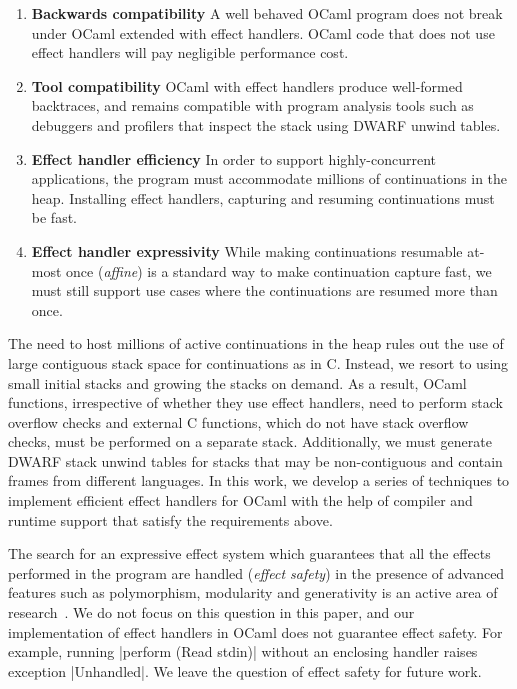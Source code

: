 \documentclass[sigplan,10pt,review,anonymous]{acmart}\settopmatter{printfolios=true,printccs=false,printacmref=false}
\begin{document}
\begin{enumerate}[label=R\arabic*]
	\item \textbf{Backwards compatibility} A well behaved OCaml program does not
		break under OCaml extended with effect handlers. OCaml code that does not
		use effect handlers will pay negligible performance cost.
	\item \textbf{Tool compatibility} OCaml with effect handlers produce
		well-formed backtraces, and remains compatible with program analysis tools
		such as debuggers and profilers that inspect the stack using DWARF unwind
		tables.
	\item \textbf{Effect handler efficiency} In order to support
		highly-concurrent applications, the program must accommodate millions of
		continuations in the heap. Installing effect handlers, capturing and
		resuming continuations must be fast.
	\item \textbf{Effect handler expressivity} While making continuations
		resumable at-most once (\emph{affine}) is a standard way to make
		continuation capture fast, we must still support use cases where the
		continuations are resumed more than once.
\end{enumerate}

The need to host millions of active continuations in the heap rules out the use
of large contiguous stack space for continuations as in C. Instead, we resort
to using small initial stacks and growing the stacks on demand. As a result,
OCaml functions, irrespective of whether they use effect handlers, need to
perform stack overflow checks and external C functions, which do not have stack
overflow checks, must be performed on a separate stack. Additionally, we must
generate DWARF stack unwind tables for stacks that may be non-contiguous and
contain frames from different languages. In this work, we develop a series of
techniques to implement efficient effect handlers for OCaml with the help of
compiler and runtime support that satisfy the requirements above.

The search for an expressive effect system which guarantees that all the
effects performed in the program are handled (\emph{effect safety}) in the
presence of advanced features such as polymorphism, modularity and generativity
is an active area of research~\cite{Leijen14, Biernacki19, Biernacki20,
Hillerstrom20}. We do not focus on this question in this paper, and our
implementation of effect handlers in OCaml does not guarantee effect safety.
For example, running |perform (Read stdin)| without an enclosing handler raises
exception |Unhandled|. We leave the question of effect safety for future work.
\end{document}
